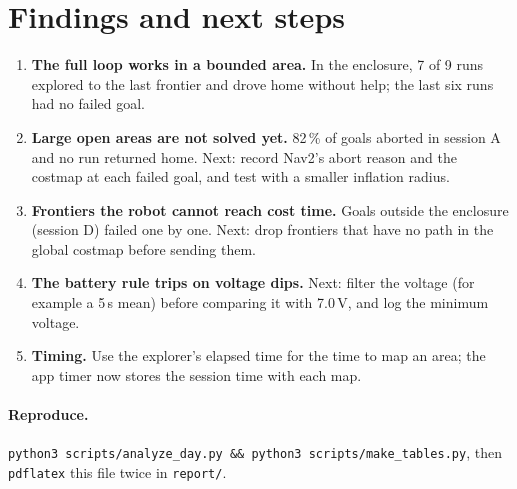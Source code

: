 \documentclass[10pt]{article}
\begin{document}
\section{Findings and next steps}
\begin{enumerate}
\item \textbf{The full loop works in a bounded area.} In the enclosure, 7 of 9 runs explored to the
last frontier and drove home without help; the last six runs had no failed goal.
\item \textbf{Large open areas are not solved yet.} 82\,\% of goals aborted in session A and no run returned home.
Next: record Nav2's abort reason and the costmap at each failed goal, and test with a smaller inflation radius.
\item \textbf{Frontiers the robot cannot reach cost time.} Goals outside the enclosure (session D) failed one by one.
Next: drop frontiers that have no path in the global costmap before sending them.
\item \textbf{The battery rule trips on voltage dips.} Next: filter the voltage (for example a 5\,s mean)
before comparing it with 7.0\,V, and log the minimum voltage.
\item \textbf{Timing.} Use the explorer's elapsed time for the time to map an area; the app timer
now stores the session time with each map.
\end{enumerate}

\paragraph{Reproduce.} \texttt{python3 scripts/analyze\_day.py \&\& python3 scripts/make\_tables.py}, then
\texttt{pdflatex} this file twice in \texttt{report/}.
\end{document}
